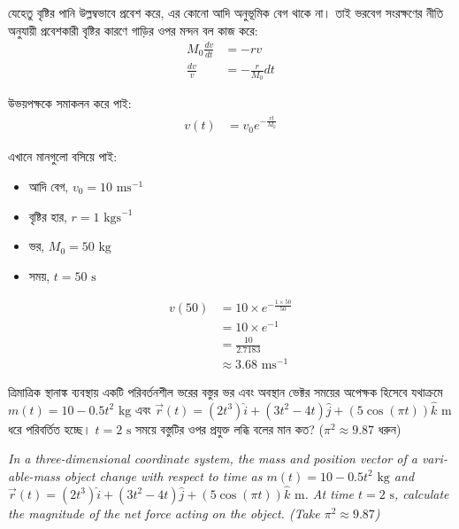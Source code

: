 \documentclass[12pt, a4paper]{article}
\begin{document}
\begin{tcolorbox}[solutionbox={সমাধান (Solution)}]
\noindent
যেহেতু বৃষ্টির পানি উল্লম্বভাবে প্রবেশ করে, এর কোনো আদি অনুভূমিক বেগ থাকে না। তাই ভরবেগ সংরক্ষণের নীতি অনুযায়ী প্রবেশকারী বৃষ্টির কারণে গাড়ির ওপর মন্দন বল কাজ করে:
\begin{align*}
    M_0 \frac{dv}{dt} &= -r v \\
    \frac{dv}{v} &= -\frac{r}{M_0} dt
\end{align*}

উভয়পক্ষকে সমাকলন করে পাই:
\begin{align*}
    v(t) &= v_0 e^{-\frac{r t}{M_0}}
\end{align*}

এখানে মানগুলো বসিয়ে পাই:
\begin{itemize}
    \item আদি বেগ, $v_0 = 10\text{ ms}^{-1}$
    \item বৃষ্টির হার, $r = 1\text{ kgs}^{-1}$
    \item ভর, $M_0 = 50\text{ kg}$
    \item সময়, $t = 50\text{ s}$
\end{itemize}

\begin{align*}
    v(50) &= 10 \times e^{-\frac{1 \times 50}{50}} \\
          &= 10 \times e^{-1} \\
          &= \frac{10}{2.7183} \\
          &\approx \mathbf{3.68}\text{ ms}^{-1}
\end{align*}
\end{tcolorbox}
\begin{tcolorbox}[questionbox={প্রশ্ন (Question) 8}]
\noindent
ত্রিমাত্রিক স্থানাঙ্ক ব্যবস্থায় একটি পরিবর্তনশীল ভরের বস্তুর ভর এবং অবস্থান ভেক্টর সময়ের অপেক্ষক হিসেবে যথাক্রমে $m(t) = 10 - 0.5t^2\text{ kg}$ এবং $\vec{r}(t) = (2t^3)\hat{i} + (3t^2 - 4t)\hat{j} + (5\cos(\pi t))\hat{k}\text{ m}$ ধরে পরিবর্তিত হচ্ছে। $t = 2\text{ s}$ সময়ে বস্তুটির ওপর প্রযুক্ত লব্ধি বলের মান কত? ($\pi^2 \approx 9.87$ ধরুন)
\vspace{0.8em}
\begin{english}
\noindent\textit{\color{darkgray}
In a three-dimensional coordinate system, the mass and position vector of a variable-mass object change with respect to time as $m(t) = 10 - 0.5t^2\text{ kg}$ and $\vec{r}(t) = (2t^3)\hat{i} + (3t^2 - 4t)\hat{j} + (5\cos(\pi t))\hat{k}\text{ m}$. At time $t = 2\text{ s}$, calculate the magnitude of the net force acting on the object. (Take $\pi^2 \approx 9.87$)
}
\end{english}
\end{tcolorbox}
\end{document}
